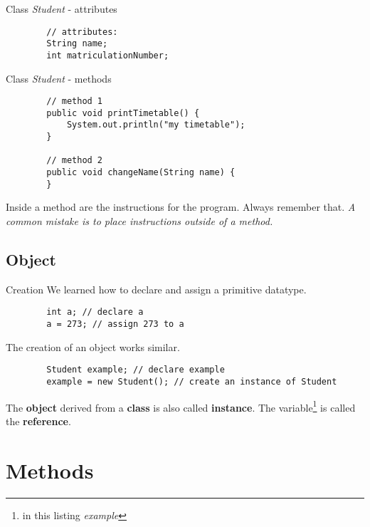 \begin{frame}[fragile]{Class \emph{Student} - attributes}
	\begin{lstlisting}
	    // attributes:
	    String name;
	    int matriculationNumber;	
	\end{lstlisting}
\end{frame}

\begin{frame}[fragile]{Class \emph{Student} - methods}
	\begin{lstlisting}
	    // method 1
	    public void printTimetable() {
	        System.out.println("my timetable");
	    }
	    
	    // method 2
	    public void changeName(String name) {
	    }
	\end{lstlisting}
	Inside a method are the instructions for the program. Always remember that. 
	\emph{A common mistake is to place instructions outside of a method.}
\end{frame}

\subsection{Object}

\begin{frame}[fragile]{Creation}
	We learned how to declare and assign a primitive datatype.
	\begin{lstlisting}
	    int a; // declare a
	    a = 273; // assign 273 to a
	\end{lstlisting} 
	The creation of an object works similar.
	\begin{lstlisting}
	    Student example; // declare example
	    example = new Student(); // create an instance of Student
	\end{lstlisting}
	The \textbf{object} derived from a \textbf{class} is also called \textbf{instance}.
	The variable\footnote{in this listing \emph{example}} is called the \textbf{reference}.
\end{frame}

\section{Methods}
